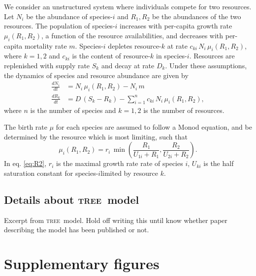\documentclass[a4paper,11pt]{article}
\newcommand{\TREE}{\textsc{tree}}
\begin{document}
We consider an unstructured system where individuals compete for two
resources. Let $N_i$ be the abundance of species-$i$ and $R_1, R_2$ be the
abundances of the two resources. The population of species-$i$ increases with
per-capita
growth rate $\mu_i(R_1,R_2)$, a function of the resource availabilities, and
decreases with per-capita mortality rate $m$. Species-$i$ depletes resource-$k$
at rate $c_{ki} \,  N_i \, \mu_i(R_1,R_2)$, where $k = 1, 2$ and $c_{ki}$ is
the content of resource-$k$ in species-$i$. Resources
are replenished
with supply rate $S_k$ and decay at rate $D_k$. Under these assumptions, the
dynamics of species and resource abundance are given by
\begin{subequations}
  \begin{align}
\label{eq:R1}
\frac{dN_i}{dt} &= N_i \, \mu_i(R_1,R_2) - N_i \, m \\
\frac{dR_k}{dt} &= D \, (S_k- R_k) - \sum_{i=1}^{n}{c_{ki} \, N_i \,
  \mu_i(R_1, R_2)},
\end{align}
\end{subequations}
where $n$ is the number of species and $k=1,2$ is the number of resources.

The birth rate $\mu$ for each species are assumed to follow a Monod equation,
and be determined by the resource which is most limiting, such that
\begin{equation}
\label{eq:R2}
\mu_i(R_1, R_2) = r_i \, \min \left(\frac{R_1}{U_{1i} + R_1},
                                    \frac{R_2}{U_{2i} + R_2} \right).
\end{equation}
In eq. \ref{eq:R2}, $r_i$ is the maximal growth rate rate of species $i$, $U_
{ki}$ is the half saturation constant for species-$i$limited by resource $k$.

\subsection{Details about \TREE\ model}\label{TREE}

Excerpt from  \TREE\ model. Hold off writing this until know whether paper describing
the model has been published or not.

\section{Supplementary figures}
\end{document}
